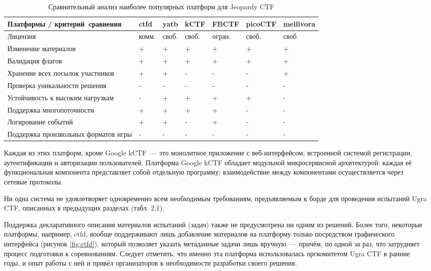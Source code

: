 \begin{longtable}{|p{5cm}|p{1cm}|p{1cm}|p{1.5cm}|p{1.5cm}|p{1.8cm}|p{2cm}|}
  \caption{Сравнительный анализ наиболее популярных платформ для Jeopardy CTF}
  \label{tab:comp}
  \\ \hline
  \textbf{Платформы / критерий~сравнения} & \textbf{ctfd} & \textbf{yatb} & \textbf{kCTF} & \textbf{FBCTF} & \textbf{picoCTF} & \textbf{mellivora}
  \\ \hline \endhead

  Лицензия & комм. & своб. & своб. & огран. & своб. & своб.
  \\ \hline
  Изменение материалов & + & + & + & + & + & +
  \\ \hline
  Валидация флагов     & + & + & + & + & + & +
  \\ \hline
  Хранение всех посылок участников & + & + & - & - & - & +
  \\ \hline
  Проверка уникальности решения & - & - & - & - & - & -
  \\ \hline
  Устойчивость к высоким нагрузкам  & - & + & + & + & + & -
  \\ \hline
  Поддержка многопоточности & + & + & + & + & - & -
  \\ \hline
  Логирование событий & + & + & - & + & - & -
  \\ \hline
  Поддержка произвольных форматов игры & - & - & - & - & - & -
  \\ \hline

\end{longtable}

Каждая из этих платформ, кроме Google kCTF~--- это монолитное приложение с веб-интерфейсом, встроенной системой регистрации, аутентификации и авторизации пользователей. Платформа Google kCTF обладает модульной микросервисной архитектурой: каждая её функциональная компонента представляет собой отдельную программу; взаимодействие между компонентами осуществляется через сетевые протоколы.

Ни одна система не удовлетворяет одновременно всем необходимым требованиям, предъявляемым к борде для проведения испытаний Ugra CTF, описанных в предыдущих разделах (табл. 2.1).

Поддержка декларативного описания материалов испытаний (задач) также не предусмотрена ни одним из решений. Более того, некоторые платформы, например, ctfd, вообще поддерживают лишь добавление материалов на платформу только посредством графического интерфейса (рисунок \ref{fig:ctfd}), который позволяет указать метаданные задачи лишь вручную~--- причём, по одной за раз, что затрудняет процесс подготовки к соревнованиям. Следует отметить, что именно эта платформа использовалась оргкомитетом Ugra CTF в ранние годы, и опыт работы с ней и привёл организаторов к необходимости разработки своего решения.

